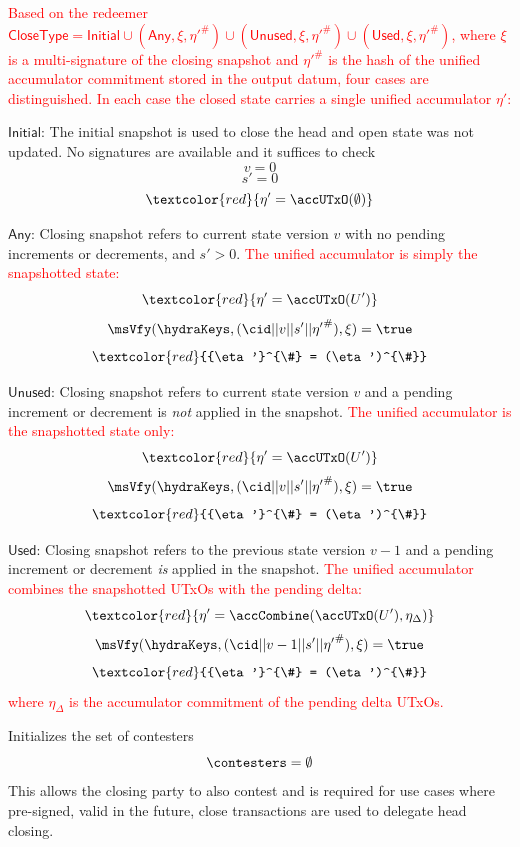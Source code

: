 \begin{menumerate}
	\item \textcolor{red}{Based on the redeemer $\mathsf{CloseType} = \mathsf{Initial} \cup (\mathsf{Any}, \xi, {\eta'}^{\#}) \cup (\mathsf{Unused}, \xi, {\eta'}^{\#}) \cup (\mathsf{Used}, \xi, {\eta'}^{\#})$, where $\xi$ is a multi-signature of the closing snapshot and ${\eta'}^{\#}$ is the hash of the unified accumulator commitment stored in the output datum, four cases are distinguished. In each case the closed state carries a single unified accumulator $\eta'$:}
	\begin{menumerate}
		\item $\mathsf{Initial}$: The initial snapshot is used to close the head and open state was not updated. No signatures are available and it suffices to check
		\[
			v = 0
		\]
		\[
			s' = 0
		\]
		\[
			\textcolor{red}{\eta' = \accUTxO(\emptyset)}
		\]
		\item $\mathsf{Any}$: Closing snapshot refers to current state version $v$ with no pending increments or decrements, and $s' > 0$. \textcolor{red}{The unified accumulator is simply the snapshotted state:}
		\[
			\textcolor{red}{\eta' = \accUTxO(U')}
		\]
		\[
			\msVfy(\hydraKeys,(\cid || v || s' || {\eta'}^{\#}),\xi) = \true
		\]
		\[
			\textcolor{red}{{\eta'}^{\#} = (\eta')^{\#}}
		\]
		\item $\mathsf{Unused}$: Closing snapshot refers to current state version $v$ and a pending increment or decrement is \emph{not} applied in the snapshot. \textcolor{red}{The unified accumulator is the snapshotted state only:}
		\[
			\textcolor{red}{\eta' = \accUTxO(U')}
		\]
		\[
			\msVfy(\hydraKeys,(\cid || v || s' || {\eta'}^{\#}),\xi) = \true
		\]
		\[
			\textcolor{red}{{\eta'}^{\#} = (\eta')^{\#}}
		\]
		\item $\mathsf{Used}$: Closing snapshot refers to the previous state version $v - 1$ and a pending increment or decrement \emph{is} applied in the snapshot. \textcolor{red}{The unified accumulator combines the snapshotted UTxOs with the pending delta:}
		\[
			\textcolor{red}{\eta' = \accCombine(\accUTxO(U'), \eta_\Delta)}
		\]
		\[
			\msVfy(\hydraKeys,(\cid || v - 1 || s' || {\eta'}^{\#}),\xi) = \true
		\]
		\[
			\textcolor{red}{{\eta'}^{\#} = (\eta')^{\#}}
		\]
		\textcolor{red}{where $\eta_\Delta$ is the accumulator commitment of the pending delta UTxOs.}
	\end{menumerate}

	\item Initializes the set of contesters
	\[
		\contesters = \emptyset
	\]
	This allows the closing party to also contest and is required for use
	cases where pre-signed, valid in the future, close transactions are
	used to delegate head closing.


\end{menumerate}

